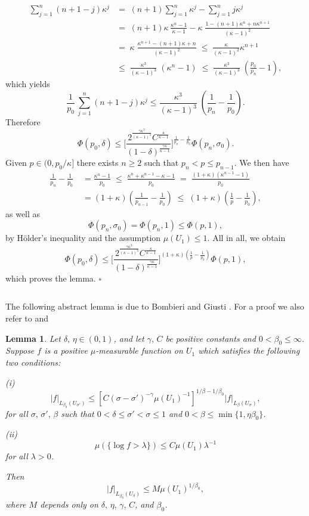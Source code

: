 \documentclass[10pt]{article}
\newtheorem{lemma}{Lemma}[section]
\begin{document}
\begin{align*}
\sum_{j=1}^n (n+1-j)\kappa^j & = \; (n+1)\sum_{j=1}^n
\kappa^j-\sum_{j=1}^n j \kappa^j\\ & =
\;(n+1)\kappa\,\frac{\kappa^n-1}{\kappa-1}-\kappa\;
\frac{1-(n+1)\kappa^n+n\kappa^{n+1}}{(\kappa-1)^2}\\ & = \;
\kappa\;\frac{\kappa^{n+1}-(n+1)\kappa+n}{(\kappa-1)^2}\;\le \;
\frac{\kappa}{(\kappa-1)^2}\kappa^{n+1}\\ & \le \;
\frac{\kappa^3}{(\kappa-1)^3}\;(\kappa^n-1)\;\le\;\frac{\kappa^3}{(\kappa-1)^3}\;
(\frac{p_0}{p_n}-1),
\end{align*}
which yields
\[ \frac{1}{p_0}\,\sum_{j=1}^n (n+1-j)\kappa^j \le \frac{\kappa^3}{(\kappa-1)^3}\;
(\frac{1}{p_n}-\frac{1}{p_0}).\] Therefore
\[ \Phi(p_0,\delta) \le \Big[
\frac{2^{\frac{\gamma
\kappa^3}{(\kappa-1)^3}}C^{\frac{\kappa}{\kappa-1}}}
{(1-\delta)^{\frac{\gamma\kappa}{\kappa-1}}}\Big]^
{\frac{1}{p_n}-\frac{1}{p_0}} \Phi(p_n,\sigma_0).
\]
Given $p\in(0,p_0/\kappa]$ there exists $n\ge 2$ such that $p_n<p\le
p_{n-1}$. We then have
\begin{align*}
\frac{1}{p_n}-\frac{1}{p_0} & \; =\frac{\kappa^n-1}{p_0}\;\le
\;\frac{\kappa^n+\kappa^{n-1}-\kappa-1}{p_0}\;=\;
\frac{(1+\kappa)(\kappa^{n-1}-1)}{p_0}\\ & \; =
(1+\kappa)(\frac{1}{p_{n-1}}-\frac{1}{p_0})\;\le\;(1+\kappa)(\frac{1}{p}-\frac{1}{p_0}),
\end{align*}
as well as
\[ \Phi(p_n,\sigma_0)=\Phi(p_n,1)\le \Phi(p,1),\]
by H\"older's inequality and the assumption $\mu(U_1)\le 1$. All in
all, we obtain
\[ \Phi(p_0,\delta)\le \Big[
\frac{2^{\frac{\gamma
\kappa^3}{(\kappa-1)^3}}C^{\frac{\kappa}{\kappa-1}}}
{(1-\delta)^{\frac{\gamma\kappa}{\kappa-1}}}\Big]^
{(1+\kappa)(\frac{1}{p}-\frac{1}{p_0})}\Phi(p,1),\] which proves the
lemma. $\square$

$\mbox{}$

The following abstract lemma is due to Bombieri and Giusti
\cite{BomGiu}. For a proof we also refer to \cite[Lemma
2.2.6]{SalCoste} and \cite[Lemma 2.6]{CZ}
\begin{lemma} \label{abslemma}
Let $\delta,\,\eta\in(0,1)$, and let $\gamma,\,C$ be positive
constants and $0<\beta_0\le \infty$. Suppose $f$ is a positive
$\mu$-measurable function on $U_1$ which satisfies the following two
conditions:

(i)
\[
|f|_{L_{\beta_0}(U_{\sigma'})}\le
[C(\sigma-\sigma')^{-\gamma}\mu(U_1)^{-1}]^{1/\beta-1/\beta_0}|f|_{L_{\beta}(U_{\sigma})},
\]
for all $\sigma,\,\sigma',\,\beta$ such that $0<\delta\le
\sigma'<\sigma\le 1$ and $0<\beta\le \min\{1,\eta\beta_0\}$.

(ii)
\[
\mu(\{\log f>\lambda\})\le C\mu(U_1)\lambda^{-1}
\]
for all $\lambda>0$.

Then
\[
|f|_{L_{\beta_0}(U_{\delta})}\le M \mu(U_1)^{1/\beta_0},
\]
where $M$ depends only on $\delta,\,\eta,\,\gamma,\,C$, and
$\beta_0$.
\end{lemma}
\end{document}
